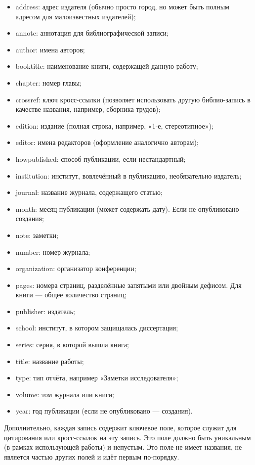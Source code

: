 \begin{itemize}
	\item address: адрес издателя (обычно просто город, но может быть полным адресом для малоизвестных издателей);
	\item annote: аннотация для библиографической записи;
	\item author: имена авторов;
	\item booktitle: наименование книги, содержащей данную работу;
	\item chapter: номер главы;
	\item crossref: ключ кросс-ссылки (позволяет использовать другую библио-запись в качестве названия, например, сборника трудов);
	\item edition: издание (полная строка, например, «1-е, стереотипное»);
	\item editor: имена редакторов (оформление аналогично авторам);
	\item howpublished: способ публикации, если нестандартный;
	\item institution: институт, вовлечённый в публикацию, необязательно издатель;
	\item journal: название журнала, содержащего статью;
	\item month: месяц публикации (может содержать дату). Если не опубликовано — создания;
	\item note: заметки;
	\item number: номер журнала;
	\item organization: организатор конференции;
	\item pages: номера страниц, разделённые запятыми или двойным дефисом. Для книги — общее количество страниц;
	\item publisher: издатель;
	\item school: институт, в котором защищалась диссертация;
	\item series: серия, в которой вышла книга;
	\item title: название работы;
	\item type: тип отчёта, например «Заметки исследователя»;
	\item volume: том журнала или книги;
	\item year: год публикации (если не опубликовано — создания).
\end{itemize}

Дополнительно, каждая запись содержит ключевое поле, которое служит для цитирования или кросс-ссылок на эту запись. Это поле должно быть уникальным (в рамках использующей работы) и непустым. Это поле не имеет названия, не является частью других полей и идёт первым по-порядку.

